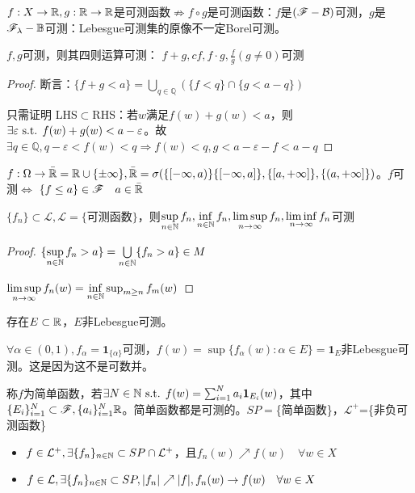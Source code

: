 \documentclass{ctexart}
\begin{document}
$f: X\to \mathbb{R},g: \mathbb{R}\to \mathbb{R}$是可测函数$\not\Rightarrow f\circ g$是可测函数：$f$是$(\mathscr{F}-\mathcal{B})$可测，$g$是$\mathscr{F}_{\lambda}-\mathbb{B}$可测：Lebesgue可测集的原像不一定Borel可测。

\begin{Prop}
  $f,g$可测，则其四则运算可测： $f+g, cf,f\cdot g, \frac{f}{g}(g\neq 0)$可测
\end{Prop}

\begin{proof}
  断言：$\{f+g<a\}=\bigcup_{q\in\mathbb{Q}}(\{f<q\}\cap\{g<a-q\})$

  只需证明 LHS$\subset$RHS：若$w$满足$f(w)+g(w)<a$，则$\exists \varepsilon\text{ s.t. } f(w)+g(w)<a-\varepsilon$。故$\exists q\in\mathbb{Q},q-\varepsilon<f(w)<q\Rightarrow f(w)<q, g<a-\varepsilon-f<a-q$
\end{proof}

\begin{Rmk}
  $f:\Omega\to\bar{\mathbb{R}}=\mathbb{R}\cup\{\pm \infty\}, \mathbb{\bar{\mathbb{R}}}=\sigma(\{[-\infty,a)\}\{[-\infty,a]\},\{[a,+\infty]\},\{(a,+\infty]\})$。$f$可测$\Leftrightarrow$ $\{f\leq a\}\in\mathscr{F}\quad a\in\bar{\mathbb{R}}$
\end{Rmk}

\begin{Prop}
  $\{f_{n}\}\subset \mathcal{L},\mathcal{L}=\{\text{可测函数}\}$，则$\sup\limits_{n\in\mathbb{N}} f_{n},\inf\limits_{n\in\mathbb{N}}f_{n},\limsup\limits_{n\to\infty}f_{n},\liminf\limits_{n\to\infty}f_{n}$可测
\end{Prop}
\begin{proof}
  $\{\sup\limits_{n\in\mathbb{N}}f_{n}>a\}=\bigcup\limits_{n\in\mathbb{N}}\{f_{n}>a\}\in M$

  $\limsup\limits_{n\to\infty}f_{n}(w)=\inf\limits_{n\in\mathbb{N}}\sup_{m\geq n}f_{m}(w)$
\end{proof}

\begin{Eg}
  存在$E\subset \mathbb{R}$，$E$非Lebesgue可测。

  $\forall \alpha\in(0,1),f_{\alpha}=\bm{1}_{\{\alpha\}}$可测，$f(w)=\sup\{f_{\alpha}(w):\alpha\in E\}=\bm{1}_{E}$非Lebesgue可测。这是因为这不是可数并。
\end{Eg}
\begin{Def}
  称$f$为简单函数，若$\exists N\in\mathbb{N}\text{ s.t. } f(w)=\sum_{i=1}^{N}a_{i}\bm{1}_{E_{i}}(w)$，其中$\{E_{i}\}_{i=1}^{N}\subset \mathscr{F}, \{a_{i}\}_{i=1}^{N}\mathbb{R}$。简单函数都是可测的。$SP=$\{简单函数\}，$\mathcal{L}^{+}$=\{非负可测函数\}
\end{Def}

\begin{Prop}[简单函数逼近可测函数]
  \begin{itemize}
  \item $f\in \mathcal{L}^{+},\exists \{f_{n}\}_{n\in\mathbb{N}}\subset SP\cap \mathcal{L}^{+}$，且$f_{n}(w)\nearrow f(w)\quad\forall w\in X$
  \item $f\in \mathcal{L},\exists \{f_{n}\}_{n\in\mathbb{N}}\subset SP,|f_{n}|\nearrow |f|,f_{n}(w)\to f(w)\quad \forall w\in X$
  \end{itemize}
\end{Prop}
\end{document}
